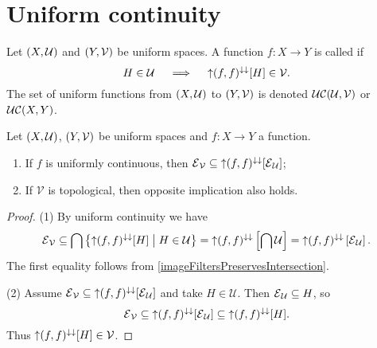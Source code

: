 \section{Uniform continuity}
\begin{definition}
Let $\left( X,\mathcal{U} \right)$ and $\left( Y,\mathcal{V} \right)$ be uniform spaces. A function $f: X\to Y$ is called  if
\[ H\in \mathcal{U} \quad\implies\quad \operatorname{\uparrow} (f, f)^{\downarrow\downarrow}[H]\in \mathcal{V}. \]
The set of uniform functions from $\left( X,\mathcal{U} \right)$ to $\left( Y,\mathcal{V} \right)$ is denoted $\operatorname{\mathcal{UC}}(\mathcal{U}, \mathcal{V})$ or $\operatorname{\mathcal{UC}}(X,Y)$.
\end{definition}


\begin{proposition} \label{uniformContinuityEntourages}
Let $\left( X,\mathcal{U} \right)$, $\left( Y,\mathcal{V} \right)$ be uniform spaces and $f: X\to Y$ a function.
\begin{enumerate}
\item If $f$ is uniformly continuous, then $\operatorname{\mathcal{E}}_\mathcal{V} \subseteq \operatorname{\uparrow} (f, f)^{\downarrow\downarrow}[\operatorname{\mathcal{E}}_\mathcal{U}]$;
\item If $\mathcal{V}$ is topological, then opposite implication also holds.
\end{enumerate}
\end{proposition}
\begin{proof}
(1) By uniform continuity we have
\[ \operatorname{\mathcal{E}}_\mathcal{V} \subseteq \bigcap\left\{ \operatorname{\uparrow} (f, f)^{\downarrow\downarrow}[H] \;\middle|\; H\in \mathcal{U} \right\} = \operatorname{\uparrow} (f, f)^{\downarrow\downarrow}\left[\bigcap \mathcal{U}\right] = \operatorname{\uparrow} (f, f)^{\downarrow\downarrow}\left[\operatorname{\mathcal{E}}_\mathcal{U}\right]. \]
The first equality follows from \ref{imageFiltersPreservesIntersection}.

(2) Assume $\operatorname{\mathcal{E}}_\mathcal{V} \subseteq \operatorname{\uparrow} (f, f)^{\downarrow\downarrow}[\operatorname{\mathcal{E}}_\mathcal{U}]$ and take $H\in \mathcal{U}$. Then $\operatorname{\mathcal{E}}_\mathcal{U}\subseteq H$, so
\[ \operatorname{\mathcal{E}}_\mathcal{V} \subseteq \operatorname{\uparrow} (f, f)^{\downarrow\downarrow}[\operatorname{\mathcal{E}}_\mathcal{U}] \subseteq \operatorname{\uparrow} (f, f)^{\downarrow\downarrow}[H]. \]
Thus $\operatorname{\uparrow} (f, f)^{\downarrow\downarrow}[H] \in\mathcal{V}$.
\end{proof}

